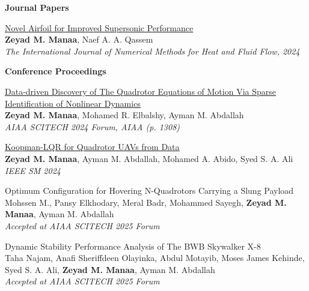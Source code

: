 \textbf{Journal Papers}
\begin{bibenum}
    \item \href{https://www.emerald.com/insight/content/doi/10.1108/HFF-06-2024-0433/full/html}{Novel Airfoil for Improved Supersonic Performance}\\
    \textbf{Zeyad M. Manaa}, Naef A. A. Qassem\\
    \textit{The International Journal of Numerical Methods for Heat and Fluid Flow, 2024}
\end{bibenum}
\vspace{0.5cm}

\textbf{Conference Proceedings}
\begin{bibenum}
    \item \href{https://arxiv.org/pdf/2305.16500}{{Data-driven Discovery of The Quadrotor Equations of Motion Via Sparse Identification of Nonlinear Dynamics}}\\
    \textbf{Zeyad M. Manaa}, Mohamed R. Elbalshy, Ayman M. Abdallah\\
    \textit{AIAA SCITECH 2024 Forum, AIAA (p. 1308)}

    \item \href{https://arxiv.org/pdf/2406.17973}{Koopman-LQR for Quadrotor UAVs from Data}\\
    \textbf{Zeyad M. Manaa}, Ayman M. Abdallah, Mohamed A. Abido, Syed S. A. Ali\\
    \textit{IEEE SM 2024}

    \item {Optimum Configuration for Hovering N-Quadrotors Carrying a Slung Payload}\\
    Mohssen M., Pansy Elkhodary, Meral Badr, Mohammed Sayegh, \textbf{Zeyad M. Manaa}, Ayman M. Abdallah\\
    \textit{Accepted at AIAA SCITECH 2025 Forum}

    \item {Dynamic Stability Performance Analysis of The BWB Skywalker X-8}\\
    Taha Najam, Anafi Sheriffdeen Olayinka, Abdul Motayib, Moses James Kehinde, Syed S. A. Ali, \textbf{Zeyad M. Manaa}, Ayman M. Abdallah\\
    \textit{Accepted at AIAA SCITECH 2025 Forum}
\end{bibenum}
\vspace{0.5cm}

